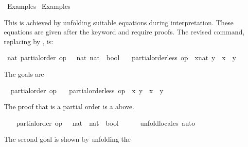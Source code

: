 %
\begin{isabellebody}%
\def\isabellecontext{Examples{\isadigit{2}}}%
%
\isadelimtheory
\isanewline
\isanewline
%
\endisadelimtheory
%
\isatagtheory
{}\isamarkupfalse%
\ Examples{}\isanewline
{}\ Examples\isanewline
{}%
\endisatagtheory
{\isafoldtheory}%
%
\isadelimtheory
%
\endisadelimtheory
%
\begin{isamarkuptext}%
This is achieved by unfolding suitable equations during
  interpretation.  These equations are given after the keyword
   and require proofs.  The revised command,
  replacing \isa{{\isasymsqsubset}} by \isa{{\isacharless}}, is:%
\end{isamarkuptext}%
\isamarkuptrue%
%
\isadelimvisible
%
\endisadelimvisible
%
\isatagvisible
{}\isamarkupfalse%
\ nat{\isacharcolon}\ partial{\isacharunderscore}order\ {\isacharbrackleft}{\isachardoublequoteopen}op\ {\isasymle}\ {\isacharcolon}{\isacharcolon}\ {\isacharbrackleft}nat{\isacharcomma}\ nat{\isacharbrackright}\ {\isasymRightarrow}\ bool{\isachardoublequoteclose}{\isacharbrackright}\isanewline
\ \ \ {\isachardoublequoteopen}partial{\isacharunderscore}order{\isachardot}less\ op\ {\isasymle}\ {\isacharparenleft}x{\isacharcolon}{\isacharcolon}nat{\isacharparenright}\ y\ {\isacharequal}\ {\isacharparenleft}x\ {\isacharless}\ y{\isacharparenright}{\isachardoublequoteclose}\isanewline
{}\isamarkupfalse%
\ {\isacharminus}%
\begin{isamarkuptxt}%
The goals are \begin{isabelle}%
\ {}{\isachardot}\ partial{\isacharunderscore}order\ op\ {\isasymle}\isanewline
\ {}{\isachardot}\ partial{\isacharunderscore}order{\isachardot}less\ op\ {\isasymle}\ x\ y\ {\isacharequal}\ {\isacharparenleft}x\ {\isacharless}\ y{\isacharparenright}%
\end{isabelle}
    The proof that \isa{{\isasymle}} is a partial order is a above.%
\end{isamarkuptxt}%
\isamarkuptrue%
\ \ \isamarkupfalse%
\ {\isachardoublequoteopen}partial{\isacharunderscore}order\ {\isacharparenleft}op\ {\isasymle}\ {\isacharcolon}{\isacharcolon}\ nat\ {\isasymRightarrow}\ nat\ {\isasymRightarrow}\ bool{\isacharparenright}{\isachardoublequoteclose}\isanewline
\ \ \ \ \isamarkupfalse%
\ unfold{\isacharunderscore}locales\ auto%
\begin{isamarkuptxt}%
The second goal is shown by unfolding the

\end{isamarkuptxt}
\end{isabellebody}
